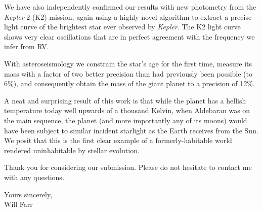\documentclass[11pt]{letter} %
\begin{document}
\begin{letter}
We have also independently confirmed our results with new photometry from the \emph{Kepler}-2 (K2) mission, again using a highly novel algorithm to extract a precise light curve of the brightest star ever observed by \emph{Kepler}. The K2 light curve shows very clear oscillations that are in perfect agreement with the frequency we infer from RV. 

With asteroseismology we constrain the star's age for the first time, measure its mass with a factor of two better precision than had previously been possible (to 6\%), and consequently obtain the mass of the giant planet to a precision of 12\%.

A neat and surprising result of this work is that while the planet has a hellish temperature today well upwards of a thousand Kelvin, when Aldebaran was on the main sequence, the planet (and more importantly any of its moons) would have been subject to similar incident starlight as the Earth receives from the Sun. We posit that this is the first clear example of a formerly-habitable world rendered uninhabitable by stellar evolution.

Thank you for considering our submission. Please do not hesitate to contact me with any questions.\\

\closing{Yours sincerely, \\
\vspace{1.0cm}
Will Farr} 
  

\end{letter}
 
\end{document}

